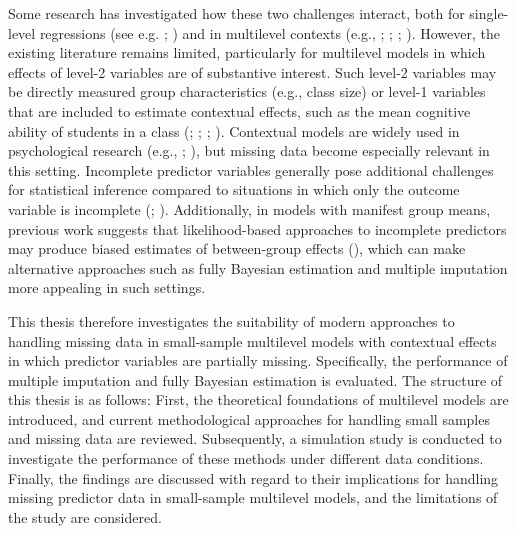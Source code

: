 \documentclass[
  letterpaper,
  11pt,
  english,
  singlespacing,
  headsepline,
  openany]{MastersDoctoralThesis}
\begin{document}
Some research has investigated how these two challenges interact, both
for single-level regressions (see e.g. ; ) and in multilevel
contexts (e.g., ;
; ; ). However,
the existing literature remains limited, particularly for multilevel
models in which effects of level-2 variables are of substantive
interest. Such level-2 variables may be directly measured group
characteristics (e.g., class size) or level-1 variables that are
included to estimate contextual effects, such as the mean cognitive
ability of students in a class (; ;
;
). Contextual models
are widely used in psychological research (e.g.,
;
), but missing data become
especially relevant in this setting. Incomplete predictor variables
generally pose additional challenges for statistical inference compared
to situations in which only the outcome variable is incomplete
(;
). Additionally, in models with
manifest group means, previous work suggests that likelihood-based
approaches to incomplete predictors may produce biased estimates of
between-group effects (),
which can make alternative approaches such as fully Bayesian estimation
and multiple imputation more appealing in such settings.

This thesis therefore investigates the suitability of modern approaches
to handling missing data in small-sample multilevel models with
contextual effects in which predictor variables are partially missing.
Specifically, the performance of multiple imputation and fully Bayesian
estimation is evaluated. The structure of this thesis is as follows:
First, the theoretical foundations of multilevel models are introduced,
and current methodological approaches for handling small samples and
missing data are reviewed. Subsequently, a simulation study is conducted
to investigate the performance of these methods under different data
conditions. Finally, the findings are discussed with regard to their
implications for handling missing predictor data in small-sample
multilevel models, and the limitations of the study are considered.
\end{document}
